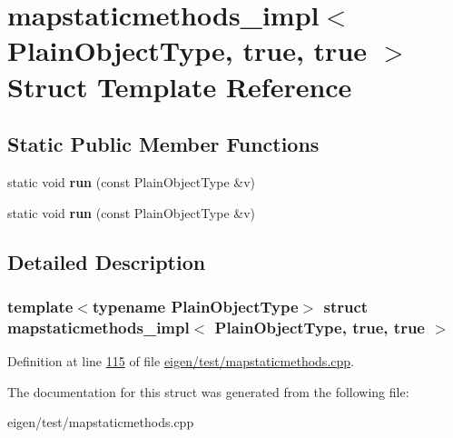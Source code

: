 \hypertarget{structmapstaticmethods__impl_3_01_plain_object_type_00_01true_00_01true_01_4}{}\section{mapstaticmethods\+\_\+impl$<$ Plain\+Object\+Type, true, true $>$ Struct Template Reference}
\label{structmapstaticmethods__impl_3_01_plain_object_type_00_01true_00_01true_01_4}
\subsection*{Static Public Member Functions}
\begin{DoxyCompactItemize}
\item 
\mbox{\label{structmapstaticmethods__impl_3_01_plain_object_type_00_01true_00_01true_01_4_ae667f51d0ffa4409cff72de1aaaec77f}} 
static void {\bfseries run} (const Plain\+Object\+Type \&v)
\item 
\mbox{\label{structmapstaticmethods__impl_3_01_plain_object_type_00_01true_00_01true_01_4_ae667f51d0ffa4409cff72de1aaaec77f}} 
static void {\bfseries run} (const Plain\+Object\+Type \&v)
\end{DoxyCompactItemize}


\subsection{Detailed Description}
\subsubsection*{template$<$typename Plain\+Object\+Type$>$\newline
struct mapstaticmethods\+\_\+impl$<$ Plain\+Object\+Type, true, true $>$}



Definition at line \hyperlink{eigen_2test_2mapstaticmethods_8cpp_source_l00115}{115} of file \hyperlink{eigen_2test_2mapstaticmethods_8cpp_source}{eigen/test/mapstaticmethods.\+cpp}.



The documentation for this struct was generated from the following file\+:\begin{DoxyCompactItemize}
\item 
eigen/test/mapstaticmethods.\+cpp\end{DoxyCompactItemize}

